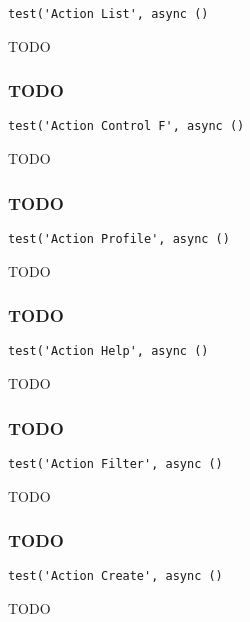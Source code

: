 \documentclass[a4paper]{article}
\begin{document}
\begin{lstlisting}
test('Action List', async ()
\end{lstlisting}

TODO

\hypertarget{toc578}{}
\subsubsection{TODO}

\begin{lstlisting}
test('Action Control F', async ()
\end{lstlisting}

TODO

\hypertarget{toc579}{}
\subsubsection{TODO}

\begin{lstlisting}
test('Action Profile', async ()
\end{lstlisting}

TODO

\hypertarget{toc580}{}
\subsubsection{TODO}

\begin{lstlisting}
test('Action Help', async ()
\end{lstlisting}

TODO

\hypertarget{toc581}{}
\subsubsection{TODO}

\begin{lstlisting}
test('Action Filter', async ()
\end{lstlisting}

TODO

\hypertarget{toc582}{}
\subsubsection{TODO}

\begin{lstlisting}
test('Action Create', async ()
\end{lstlisting}

TODO
\end{document}
